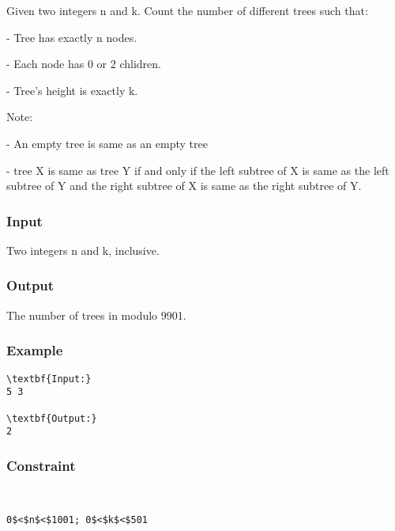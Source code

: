



   Given two integers n and k. Count the number of different trees such that:  

   - Tree has exactly n nodes.  

   - Each node has 0 or 2 chlidren.  

   - Tree's height is exactly k.  

   Note:  

   - An empty tree is same as an empty tree  

   - tree X is same as tree Y if and only if the left subtree of X is same as the left subtree of Y and the right subtree of X is same as the right subtree of Y.  

\subsubsection{   Input  }

   Two integers n and k, inclusive.  

\subsubsection{   Output  }

   The number of trees in modulo 9901.  

\subsubsection{   Example  }
\begin{verbatim}
\textbf{Input:}
5 3

\textbf{Output:}
2\end{verbatim}

\subsubsection{   Constraint  }
\begin{verbatim}


0$<$n$<$1001; 0$<$k$<$501\end{verbatim}